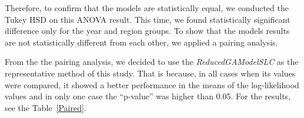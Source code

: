Therefore, to confirm that the models are statistically equal, we
conducted the Tukey HSD on this ANOVA result. This time, we found
statistically significant difference only for the year and region
groups. To show that the models results are not statistically
different from each other, we applied a pairing analysis.

From the the pairing analysis, we decided to use the
\textit{ReducedGAModelSLC} as the representative method of this
study. That is because, in all cases when its values were compared, it
showed a better performance in the means of the log-likelihood values
and in only one case the ``p-value'' was higher than 0.05. For the
results, see the Table~\ref{Paired}.



